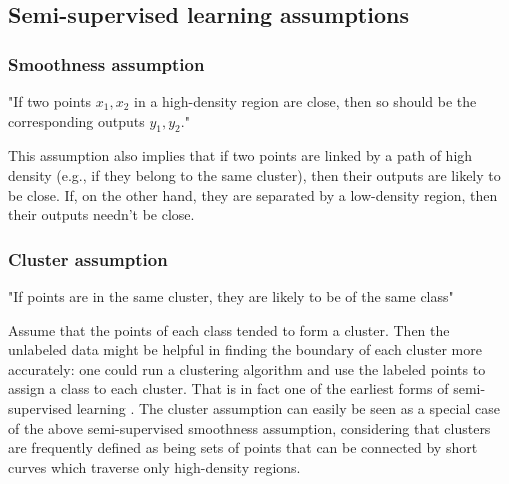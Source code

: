 \documentclass[12pt]{article}
\theoremstyle{definition}
\DeclareRobustCommand{\[}{\begin{equation}}
\DeclareRobustCommand{\]}{\end{equation}}
\begin{document}
\subsection{Semi-supervised learning assumptions}
    \subsubsection{Smoothness assumption}
        "If two points $x_1, x_2$ in a high-density region are close, then so should be the corresponding outputs $y_1, y_2$." \par
        This assumption also implies that if two points are linked by
        a path of high density (e.g., if they belong to the same cluster), then their outputs
        are likely to be close. If, on the other hand, they are separated by a low-density
        region, then their outputs needn't be close.
        
    \subsubsection{Cluster assumption}
        "If points are in the same cluster, they are likely to be of the
        same class" \par
        Assume that the points of each class tended to form a cluster. Then the
        unlabeled data might be helpful in finding the boundary of each cluster more accurately:
        one could run a clustering algorithm and use the labeled points to assign a class
        to each cluster. That is in fact one of the earliest forms of semi-supervised learning
        \cite{Semi-Supervised-Book}. 
        The cluster assumption can easily be seen as a special case of the above
        semi-supervised smoothness assumption, considering that clusters are frequently
        defined as being sets of points that can be connected by short curves which traverse
        only high-density regions.
    
\end{document}
